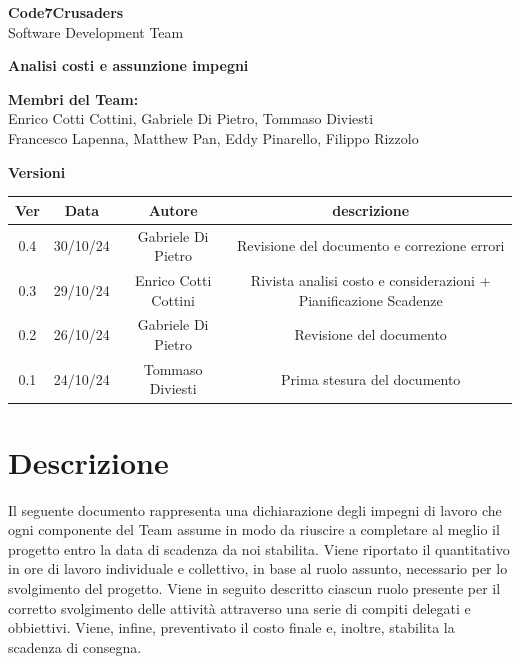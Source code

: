 \documentclass{article}
\begin{document}
\begin{titlepage}
    {\Huge \textbf{Code7Crusaders}}\\
    \vspace{0.5cm}
    {\Large Software Development Team}\\
    \vspace{2cm}
    
    \large \textbf{Analisi costi e assunzione impegni}
    \vspace{5cm}

    \textbf{Membri del Team:}\\
    Enrico Cotti Cottini, Gabriele Di Pietro, Tommaso Diviesti \\
    Francesco Lapenna, Matthew Pan, Eddy Pinarello, Filippo Rizzolo \\
    \vspace{0.5cm}
    
    \vspace{1cm}
\end{titlepage}

\newpage
\begin{center}
    \textbf{Versioni}
    \\
    \vspace{0.3cm}
    \begin{tabular}{|c|c|c|c|}
        \hline
        \textbf{Ver} & \textbf{Data} & \textbf{Autore} & \textbf{descrizione}\\
        \hline
        0.4 & 30/10/24 & Gabriele Di Pietro & Revisione del documento e correzione errori \\
        \hline
        0.3 & 29/10/24 & Enrico Cotti Cottini & Rivista analisi costo e considerazioni + Pianificazione Scadenze  \\
        \hline
        0.2 & 26/10/24 & Gabriele Di Pietro & Revisione del documento \\
        \hline
        0.1 & 24/10/24 & Tommaso Diviesti & Prima stesura del documento \\
        \hline
    \end{tabular}
\end{center}

\newpage
\tableofcontents
\newpage

\section{Descrizione}
Il seguente documento rappresenta una dichiarazione degli impegni di lavoro che ogni componente del Team assume in modo da 
riuscire a completare al meglio il progetto entro la data di scadenza da noi stabilita. Viene riportato il quantitativo in 
ore di lavoro individuale e collettivo, in base al ruolo assunto, necessario per lo svolgimento del progetto. Viene in seguito 
descritto ciascun ruolo presente per il corretto svolgimento delle attività attraverso una serie di compiti delegati e obbiettivi. 
Viene, infine, preventivato il costo finale e, inoltre, stabilita la scadenza di consegna.
\newpage
\end{document}
